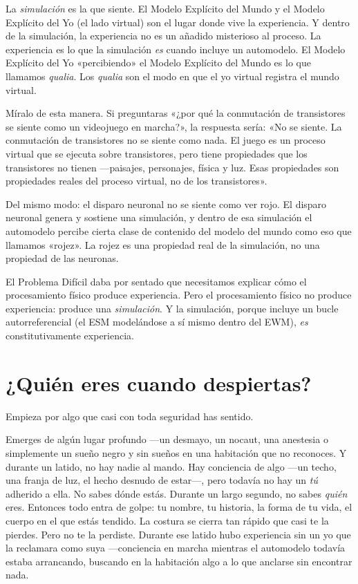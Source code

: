 \documentclass[11pt, twoside, openright]{book}
\begin{document}
La \textit{simulación} es la que siente. El Modelo Explícito del Mundo y el Modelo Explícito del Yo (el lado virtual) son el lugar donde vive la experiencia. Y dentro de la simulación, la experiencia no es un añadido misterioso al proceso. La experiencia es lo que la simulación \textit{es} cuando incluye un automodelo. El Modelo Explícito del Yo «percibiendo» el Modelo Explícito del Mundo es lo que llamamos \textit{qualia}. Los \textit{qualia} son el modo en que el yo virtual registra el mundo virtual.

Míralo de esta manera. Si preguntaras «¿por qué la conmutación de transistores se siente como un videojuego en marcha?», la respuesta sería: «No se siente. La conmutación de transistores no se siente como nada. El juego es un proceso virtual que se ejecuta sobre transistores, pero tiene propiedades que los transistores no tienen ---paisajes, personajes, física y luz. Esas propiedades son propiedades reales del proceso virtual, no de los transistores».

Del mismo modo: el disparo neuronal no se siente como ver rojo. El disparo neuronal genera y sostiene una simulación, y dentro de esa simulación el automodelo percibe cierta clase de contenido del modelo del mundo como eso que llamamos «rojez». La rojez es una propiedad real de la simulación, no una propiedad de las neuronas.

El Problema Difícil daba por sentado que necesitamos explicar cómo el procesamiento físico produce experiencia. Pero el procesamiento físico no produce experiencia: produce una \textit{simulación}. Y la simulación, porque incluye un bucle autorreferencial (el ESM modelándose a sí mismo dentro del EWM), \textit{es} constitutivamente experiencia.

\section*{¿Quién eres cuando despiertas?}

Empieza por algo que casi con toda seguridad has sentido.

Emerges de algún lugar profundo ---un desmayo, un nocaut, una anestesia o simplemente un sueño negro y sin sueños en una habitación que no reconoces. Y durante un latido, no hay nadie al mando. Hay conciencia de algo ---un techo, una franja de luz, el hecho desnudo de estar---, pero todavía no hay un \textit{tú} adherido a ella. No sabes dónde estás. Durante un largo segundo, no sabes \textit{quién} eres. Entonces todo entra de golpe: tu nombre, tu historia, la forma de tu vida, el cuerpo en el que estás tendido. La costura se cierra tan rápido que casi te la pierdes. Pero no te la perdiste. Durante ese latido hubo experiencia sin un yo que la reclamara como suya ---conciencia en marcha mientras el automodelo todavía estaba arrancando, buscando en la habitación algo a lo que anclarse sin encontrar nada.
\end{document}
